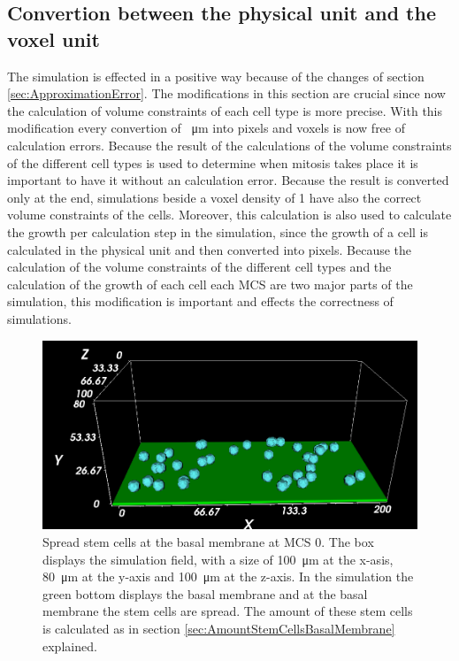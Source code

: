 \subsection{Convertion between the physical unit and the voxel unit}
The simulation is effected in a positive way because of the changes of section \ref{sec:ApproximationError}. The modifications in this section are crucial since now the calculation of volume constraints of each cell type is more precise. With this modification every convertion of \SI{}{\micro\metre} into pixels and voxels is now free of calculation errors. Because the result of the calculations of the volume constraints of the different cell types is used to determine when mitosis takes place it is important to have it without an calculation error. Because the result is converted only at the end, simulations beside a voxel density of 1 have also the correct volume constraints of the cells. Moreover, this calculation is also used to calculate the growth per calculation step in the simulation, since the growth of a cell is calculated in the physical unit and then converted into pixels. Because the calculation of the volume constraints of the different cell types and the calculation of the growth of each cell each \ac{MCS} are two major parts of the simulation, this modification is important and effects the correctness of simulations.
\newline
\newline

\begin{figure}[ht]
	\center
	\includegraphics[scale=0.4]{figures/SimulationAtMCS0.png}
	\caption[Spread stem cells at the basal membrane at \ac{MCS} 0]{Spread stem cells at the basal membrane at \ac{MCS} 0. The box displays the simulation field, with a size of \SI{100}{\micro\metre} at the x-asis, \SI{80}{\micro\metre} at the y-axis and \SI{100}{\micro\metre} at the z-axis. In the simulation the green bottom displays the basal membrane and at the basal membrane the stem cells are spread. The amount of these stem cells is calculated as in section \ref{sec:AmountStemCellsBasalMembrane} explained.}
	\label{img:SimulationAtMCS0}
\end{figure}


